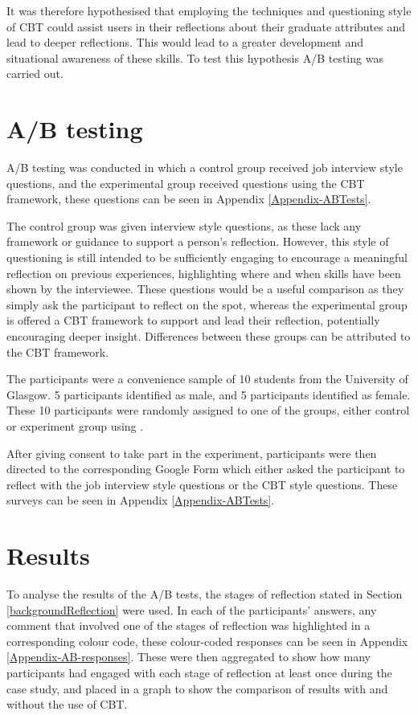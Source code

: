 \documentclass{l4proj}
\begin{document}
It was therefore hypothesised that employing the techniques and questioning style of CBT could assist users in their reflections about their graduate attributes and lead to deeper reflections. This would lead to a greater development and situational awareness of these skills. To test this hypothesis A/B testing was carried out.


\section{A/B testing}

A/B testing was conducted in which a control group received job interview style questions, and the experimental group received questions using the CBT framework, these questions can be seen in Appendix \ref{Appendix-ABTests}. 

The control group was given interview style questions, as these lack any framework or guidance to support a person's reflection. However, this style of questioning is still intended to be sufficiently engaging to encourage a meaningful reflection on previous experiences, highlighting where and when skills have been shown by the interviewee. These questions would be a useful comparison as they simply ask the participant to reflect on the spot, whereas the experimental group is offered a CBT framework to support and lead their reflection, potentially encouraging deeper insight. Differences between these groups can be attributed to the CBT framework. 

The participants were a convenience sample of 10 students from the University of Glasgow. 5 participants identified as male, and 5 participants identified as female. These 10 participants were randomly assigned to one of the groups, either control or experiment group using \citet{random_lists_random_2013}.

After giving consent to take part in the experiment, participants were then directed to the corresponding Google Form which either asked the participant to reflect with the job interview style questions or the CBT style questions. These surveys can be seen in Appendix \ref{Appendix-ABTests}.

\section{Results}

To analyse the results of the A/B tests, the stages of reflection stated in Section \ref{backgroundReflection} were used. In each of the participants' answers, any comment that involved one of the stages of reflection was highlighted in a corresponding colour code, these colour-coded responses can be seen in Appendix \ref{Appendix-AB-responses}. These were then aggregated to show how many participants had engaged with each stage of reflection at least once during the case study, and placed in a graph to show the comparison of results with and without the use of CBT.
\end{document}
